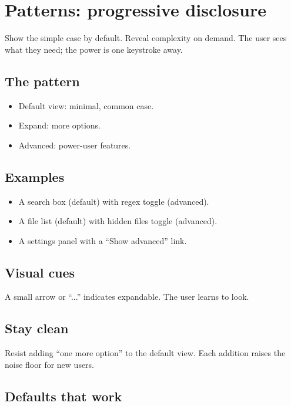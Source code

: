 \chapter{Patterns: progressive disclosure}
\label{ch:progdisc}

\begin{aside}
Show the simple case by default. Reveal complexity on
demand. The user sees what they need; the power is one
keystroke away.
\end{aside}

\section{The pattern}

\begin{itemize}[leftmargin=*]
  \item Default view: minimal, common case.
  \item Expand: more options.
  \item Advanced: power-user features.
\end{itemize}

\section{Examples}

\begin{itemize}[leftmargin=*]
  \item A search box (default) with regex toggle
    (advanced).
  \item A file list (default) with hidden files toggle
    (advanced).
  \item A settings panel with a ``Show advanced'' link.
\end{itemize}

\section{Visual cues}

A small arrow or ``...'' indicates expandable. The user
learns to look.

\section{Stay clean}

Resist adding ``one more option'' to the default view. Each
addition raises the noise floor for new users.

\section{Defaults that work}

